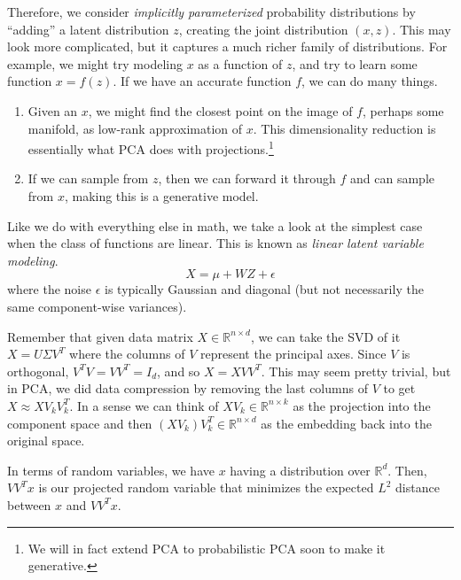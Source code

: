   Therefore, we consider \textit{implicitly parameterized} probability distributions by ``adding'' a latent distribution $z$, creating the joint distribution $(x, z)$. This may look more complicated, but it captures a much richer family of distributions. For example, we might try modeling $x$ as a function of $z$, and try to learn some function $x = f(z)$. If we have an accurate function $f$, we can do many things. 
  \begin{enumerate}
    \item Given an $x$, we might find the closest point on the image of $f$, perhaps some manifold, as low-rank approximation of $x$. This dimensionality reduction is essentially what PCA does with projections.\footnote{We will in fact extend PCA to probabilistic PCA soon to make it generative.} 
    \item If we can sample from $z$, then we can forward it through $f$ and can sample from $x$, making this is a generative model. 
  \end{enumerate}

  Like we do with everything else in math, we take a look at the simplest case when the class of functions are linear. This is known as \textit{linear latent variable modeling}. 
  \begin{equation}
    X = \mu + W Z + \epsilon
  \end{equation}
  where the noise $\epsilon$ is typically Gaussian and diagonal (but not necessarily the same component-wise variances). 

  Remember that given data matrix $X \in \mathbb{R}^{n \times d}$, we can take the SVD of it $X = U \Sigma V^T$ where the columns of $V$ represent the principal axes. Since $V$ is orthogonal, $V^T V = V V^T = I_d$, and so $X = X V V^T$. This may seem pretty trivial, but in PCA, we did data compression by removing the last columns of $V$ to get $X \approx X V_k V_k^T$. In a sense we can think of $XV_k \in \mathbb{R}^{n \times k}$ as the projection into the component space and then $(X V_k) V_k^T \in \mathbb{R}^{n \times d}$ as the embedding back into the original space. 

  In terms of random variables, we have $x$ having a distribution over $\mathbb{R}^{d}$. Then, $V V^T x$ is our projected random variable that minimizes the expected $L^2$ distance between $x$ and $V V^T x$. 
  
